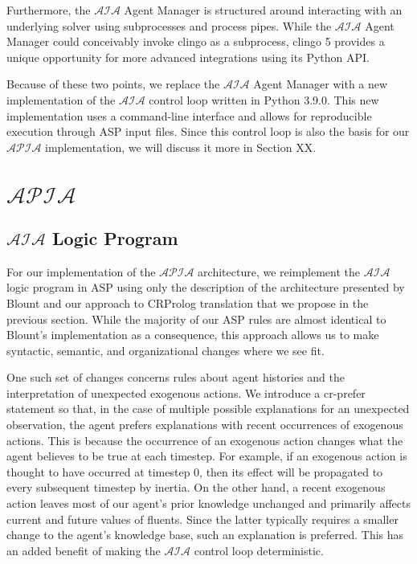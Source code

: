Furthermore, the $\mathcal{AIA}$ Agent Manager is structured around interacting with an underlying solver using subprocesses and process pipes.
While the $\mathcal{AIA}$ Agent Manager could conceivably invoke clingo as a subprocess, clingo 5 provides a unique opportunity for more advanced integrations using its Python API.

Because of these two points, we replace the $\mathcal{AIA}$ Agent Manager with a new implementation of the $\mathcal{AIA}$ control loop written in Python 3.9.0.
This new implementation uses a command-line interface and allows for reproducible execution through ASP input files.
Since this control loop is also the basis for our $\mathcal{APIA}$ implementation, we will discuss it more in Section XX.

\section{$\mathcal{APIA}$}

\subsection{$\mathcal{AIA}$ Logic Program}

For our implementation of the $\mathcal{APIA}$ architecture, we re­implement the $\mathcal{AIA}$ logic program in ASP using only the description of the architecture presented by Blount and our approach to CR­Prolog translation that we propose in the previous section.
While the majority of our ASP rules are almost identical to Blount's implementation as a consequence, this approach allows us to make syntactic, semantic, and organizational changes where we see fit.

One such set of changes concerns rules about agent histories and the interpretation of unexpected exogenous actions.
We introduce a cr-prefer statement so that, in the case of multiple possible explanations for an unexpected observation, the agent prefers explanations with recent occurrences of exogenous actions.
This is because the occurrence of an exogenous action changes what the agent believes to be true at each timestep.
For example, if an exogenous action is thought to have occurred at timestep 0, then its effect will be propagated to every subsequent timestep by inertia.
On the other hand, a recent exogenous action leaves most of our agent's prior knowledge unchanged and primarily affects current and future values of fluents.
Since the latter typically requires a smaller change to the agent's knowledge base, such an explanation is preferred.
This has an added benefit of making the $\mathcal{AIA}$ control loop deterministic.


